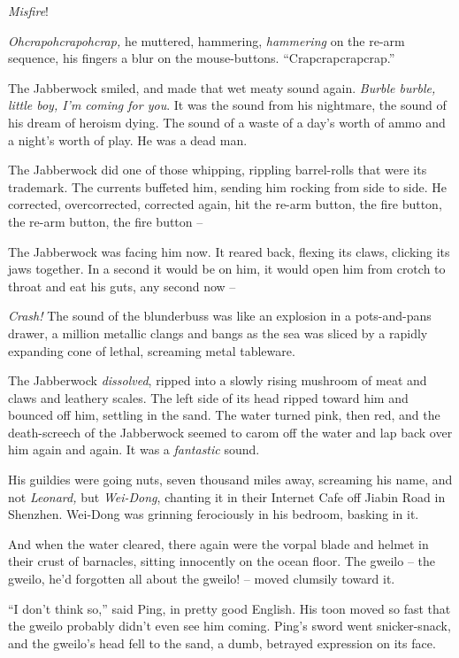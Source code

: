 \emph{Misfire}!

\emph{Ohcrapohcrapohcrap,} he muttered, hammering, \emph{hammering}
on the re-arm sequence, his fingers a blur on the mouse-buttons.
``Crapcrapcrapcrap.''

The Jabberwock smiled, and made that wet meaty sound again.
\emph{Burble burble, little boy, I'm coming for you}. It was the
sound from his nightmare, the sound of his dream of heroism dying.
The sound of a waste of a day's worth of ammo and a night's worth
of play. He was a dead man.

The Jabberwock did one of those whipping, rippling barrel-rolls
that were its trademark. The currents buffeted him, sending him
rocking from side to side. He corrected, overcorrected, corrected
again, hit the re-arm button, the fire button, the re-arm button,
the fire button --

The Jabberwock was facing him now. It reared back, flexing its
claws, clicking its jaws together. In a second it would be on him,
it would open him from crotch to throat and eat his guts, any
second now --

\emph{Crash!} The sound of the blunderbuss was like an explosion in
a pots-and-pans drawer, a million metallic clangs and bangs as the
sea was sliced by a rapidly expanding cone of lethal, screaming
metal tableware.

The Jabberwock \emph{dissolved}, ripped into a slowly rising
mushroom of meat and claws and leathery scales. The left side of
its head ripped toward him and bounced off him, settling in the
sand. The water turned pink, then red, and the death-screech of the
Jabberwock seemed to carom off the water and lap back over him
again and again. It was a \emph{fantastic} sound.

His guildies were going nuts, seven thousand miles away, screaming
his name, and not \emph{Leonard,} but \emph{Wei-Dong}, chanting it
in their Internet Cafe off Jiabin Road in Shenzhen. Wei-Dong was
grinning ferociously in his bedroom, basking in it.

And when the water cleared, there again were the vorpal blade and
helmet in their crust of barnacles, sitting innocently on the ocean
floor. The gweilo -- the gweilo, he'd forgotten all about the
gweilo! -- moved clumsily toward it.

``I don't think so,'' said Ping, in pretty good English. His toon
moved so fast that the gweilo probably didn't even see him coming.
Ping's sword went snicker-snack, and the gweilo's head fell to the
sand, a dumb, betrayed expression on its face.

